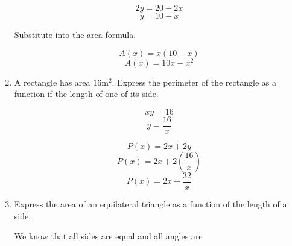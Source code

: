 \documentclass{article}
\begin{document}
\begin{enumerate}
		$$2y = 20 - 2x$$
		$$y = 10 - x$$
		
		Substitute into the area formula.
		
		$$A(x) = x(10 - x)$$
		$$A(x) = 10x - x^2$$
		
	\item A rectangle has area $16 \text{m}^2$. Express the perimeter of the rectangle as a
		function if the length of one of its side.
		
		$$xy = 16$$
		$$y = \frac{16}{x}$$
		
		$$P(x) = 2x + 2y$$
		$$P(x) = 2x + 2(\frac{16}{x})$$
		$$P(x) = 2x + \frac{32}{x}$$
		
	\item Express the area of an equilateral triangle as a function of the length of a side.
	
		We know that all sides are equal and all angles are 

	\end{enumerate}
	
\end{document}
